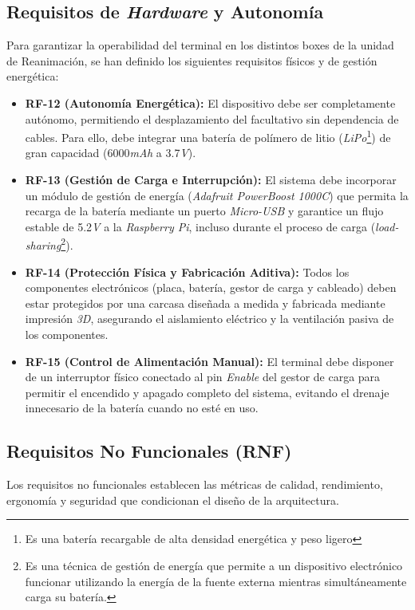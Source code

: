 \subsection{Requisitos de \textit{Hardware} y Autonomía}
Para garantizar la operabilidad del terminal en los distintos boxes de la unidad de Reanimación, se han definido los siguientes requisitos físicos y de gestión energética:

\begin{itemize}
    \item \textbf{RF-12 (Autonomía Energética):} El dispositivo debe ser completamente autónomo, permitiendo el desplazamiento del facultativo sin dependencia de cables. Para ello, debe integrar una batería de polímero de litio (\textit{LiPo}\footnote{Es una batería recargable de alta densidad energética y peso ligero}) de gran capacidad (6000\textit{mAh} a 3.7\textit{V}).
    \item \textbf{RF-13 (Gestión de Carga e Interrupción):} El sistema debe incorporar un módulo de gestión de energía (\textit{Adafruit PowerBoost 1000C}) que permita la recarga de la batería mediante un puerto \textit{Micro-USB} y garantice un flujo estable de 5.2\textit{V} a la \textit{Raspberry Pi}, incluso durante el proceso de carga (\textit{load-sharing}\footnote{Es una técnica de gestión de energía que permite a un dispositivo electrónico funcionar utilizando la energía de la fuente externa mientras simultáneamente carga su batería.}).
    \item \textbf{RF-14 (Protección Física y Fabricación Aditiva):} Todos los componentes electrónicos (placa, batería, gestor de carga y cableado) deben estar protegidos por una carcasa diseñada a medida y fabricada mediante impresión \textit{3D}, asegurando el aislamiento eléctrico y la ventilación pasiva de los componentes.
    \item \textbf{RF-15 (Control de Alimentación Manual):} El terminal debe disponer de un interruptor físico conectado al pin \textit{Enable} del gestor de carga para permitir el encendido y apagado completo del sistema, evitando el drenaje innecesario de la batería cuando no esté en uso.
\end{itemize}

\subsection{Requisitos No Funcionales (RNF)}
Los requisitos no funcionales establecen las métricas de calidad, rendimiento, ergonomía y seguridad que condicionan el diseño de la arquitectura.

